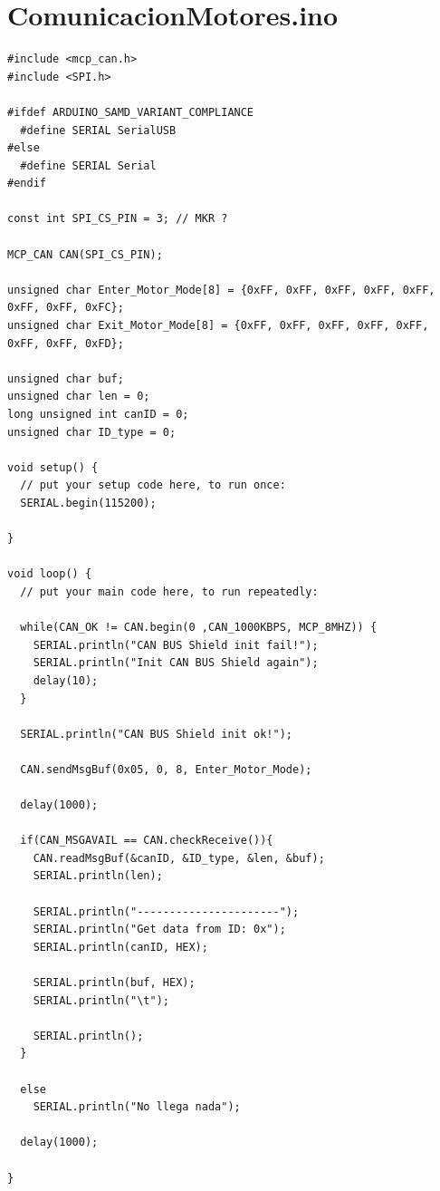 \chapter{ComunicacionMotores.ino} \label{ComunicacionMotores.ino}
\blankpage

\begin{lstlisting}[language=Arduino, caption= ComunicacionMotores.ino, basicstyle=\scriptsize]
#include <mcp_can.h>
#include <SPI.h>

#ifdef ARDUINO_SAMD_VARIANT_COMPLIANCE
  #define SERIAL SerialUSB
#else
  #define SERIAL Serial
#endif

const int SPI_CS_PIN = 3; // MKR ?

MCP_CAN CAN(SPI_CS_PIN);

unsigned char Enter_Motor_Mode[8] = {0xFF, 0xFF, 0xFF, 0xFF, 0xFF, 0xFF, 0xFF, 0xFC};
unsigned char Exit_Motor_Mode[8] = {0xFF, 0xFF, 0xFF, 0xFF, 0xFF, 0xFF, 0xFF, 0xFD};

unsigned char buf;
unsigned char len = 0;
long unsigned int canID = 0;
unsigned char ID_type = 0;

void setup() {
  // put your setup code here, to run once:
  SERIAL.begin(115200);

}

void loop() {
  // put your main code here, to run repeatedly:

  while(CAN_OK != CAN.begin(0 ,CAN_1000KBPS, MCP_8MHZ)) {
    SERIAL.println("CAN BUS Shield init fail!");
    SERIAL.println("Init CAN BUS Shield again");
    delay(10);
  }

  SERIAL.println("CAN BUS Shield init ok!");

  CAN.sendMsgBuf(0x05, 0, 8, Enter_Motor_Mode);

  delay(1000);
  
  if(CAN_MSGAVAIL == CAN.checkReceive()){
    CAN.readMsgBuf(&canID, &ID_type, &len, &buf);
    SERIAL.println(len);
  
    SERIAL.println("----------------------");
    SERIAL.println("Get data from ID: 0x");
    SERIAL.println(canID, HEX);

    SERIAL.println(buf, HEX);
    SERIAL.println("\t");

    SERIAL.println();
  }

  else
    SERIAL.println("No llega nada");

  delay(1000);

}
\end{lstlisting}

\blankpage